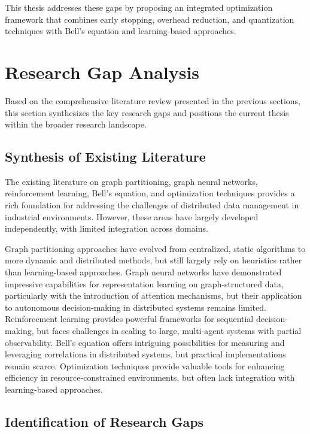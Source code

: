 \documentclass{article}
\begin{document}
This thesis addresses these gaps by proposing an integrated optimization framework that combines early stopping, overhead reduction, and quantization techniques with Bell's equation and learning-based approaches.

\section{Research Gap Analysis}

Based on the comprehensive literature review presented in the previous sections, this section synthesizes the key research gaps and positions the current thesis within the broader research landscape.

\subsection{Synthesis of Existing Literature}

The existing literature on graph partitioning, graph neural networks, reinforcement learning, Bell's equation, and optimization techniques provides a rich foundation for addressing the challenges of distributed data management in industrial environments. However, these areas have largely developed independently, with limited integration across domains.

Graph partitioning approaches have evolved from centralized, static algorithms to more dynamic and distributed methods, but still largely rely on heuristics rather than learning-based approaches. Graph neural networks have demonstrated impressive capabilities for representation learning on graph-structured data, particularly with the introduction of attention mechanisms, but their application to autonomous decision-making in distributed systems remains limited. Reinforcement learning provides powerful frameworks for sequential decision-making, but faces challenges in scaling to large, multi-agent systems with partial observability. Bell's equation offers intriguing possibilities for measuring and leveraging correlations in distributed systems, but practical implementations remain scarce. Optimization techniques provide valuable tools for enhancing efficiency in resource-constrained environments, but often lack integration with learning-based approaches.

\subsection{Identification of Research Gaps}
\end{document}
